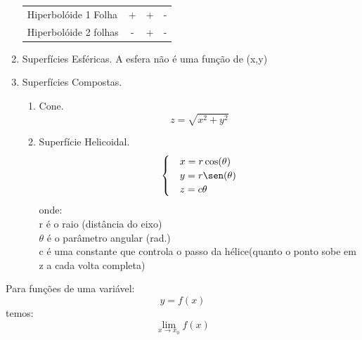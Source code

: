 \begin{enumerate}
\begin{table}[H]
\begin{tabular}{lccc}
Hiperbolóide 1 Folha  & +          & +         & -\\
Hiperbolóide 2 folhas & -          & +         & -\\ 
\bottomrule
\end{tabular}
\end{table}
  \item Superfícies Esféricas.
  A esfera não é uma função de (x,y)
  \item Superfícies Compostas.
      \begin{enumerate}
        \item Cone.
        \[ z=\sqrt{x^2+y^2} \]
        \item Superfície Helicoidal.
        \[\begin{cases}
          &x=r\cos(\theta)\\
          &y=r\sen(\theta)\\
          &z=c\theta\\
        \end{cases}\]
        onde:\\
        r é o raio (distância do eixo)\\
        $\theta$ é o parâmetro angular (rad.)\\
        c é uma constante que controla o passo da hélice(quanto o ponto
        sobe em z a cada volta completa)
      \end{enumerate}
\end{enumerate}
Para funções de uma variável:
\[ y=f(x) \] temos:
\[
\lim_{x\rightarrow x_0} f(x)
\]


